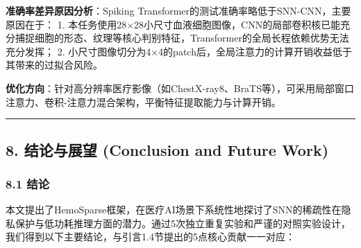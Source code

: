 \documentclass[
]{article}
\begin{document}
\textbf{准确率差异原因分析}：Spiking
Transformer的测试准确率略低于SNN-CNN，主要原因在于： 1.
本任务使用28×28小尺寸血液细胞图像，CNN的局部卷积核已能充分捕捉细胞的形态、纹理等核心判别特征，Transformer的全局长程依赖优势无法充分发挥；
2.
小尺寸图像切分为4×4的patch后，全局注意力的计算开销收益低于其带来的过拟合风险。

\textbf{优化方向}：针对高分辨率医疗影像（如ChestX-ray8、BraTS等），可采用局部窗口注意力、卷积-注意力混合架构，平衡特征提取能力与计算开销。

\begin{center}\rule{0.5\linewidth}{0.5pt}\end{center}

\subsection{8. 结论与展望 (Conclusion and Future
Work)}\label{ux7ed3ux8bbaux4e0eux5c55ux671b-conclusion-and-future-work}

\subsubsection{8.1 结论}\label{ux7ed3ux8bba}

本文提出了HemoSparse框架，在医疗AI场景下系统性地探讨了SNN的稀疏性在隐私保护与低功耗推理方面的潜力。通过5次独立重复实验和严谨的对照实验设计，我们得到以下主要结论，与引言1.4节提出的5点核心贡献一一对应：
\end{document}
